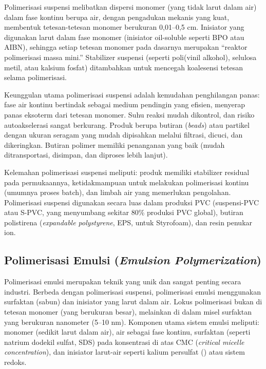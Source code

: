 \documentclass[12pt,a4paper,openany]{book}
\begin{document}
Polimerisasi suspensi melibatkan dispersi monomer (yang tidak larut dalam air) dalam fase kontinu berupa air, dengan pengadukan mekanis yang kuat, membentuk tetesan-tetesan monomer berukuran 0,01--0,5 cm. Inisiator yang digunakan larut dalam fase monomer (inisiator oil-soluble seperti BPO atau AIBN), sehingga setiap tetesan monomer pada dasarnya merupakan ``reaktor polimerisasi massa mini.'' Stabilizer suspensi (seperti poli(vinil alkohol), selulosa metil, atau kalsium fosfat) ditambahkan untuk mencegah koalesensi tetesan selama polimerisasi.

Keunggulan utama polimerisasi suspensi adalah kemudahan penghilangan panas: fase air kontinu bertindak sebagai medium pendingin yang efisien, menyerap panas eksoterm dari tetesan monomer. Suhu reaksi mudah dikontrol, dan risiko autoakselerasi sangat berkurang. Produk berupa butiran (\textit{beads}) atau partikel dengan ukuran seragam yang mudah dipisahkan melalui filtrasi, dicuci, dan dikeringkan. Butiran polimer memiliki penanganan yang baik (mudah ditransportasi, disimpan, dan diproses lebih lanjut).

Kelemahan polimerisasi suspensi meliputi: produk memiliki stabilizer residual pada permukaannya, ketidakmampuan untuk melakukan polimerisasi kontinu (umumnya proses batch), dan limbah air yang memerlukan pengolahan. Polimerisasi suspensi digunakan secara luas dalam produksi PVC (suspensi-PVC atau S-PVC, yang menyumbang sekitar 80\% produksi PVC global), butiran polistirena (\textit{expandable polystyrene}, EPS, untuk Styrofoam), dan resin penukar ion.

\subsection{Polimerisasi Emulsi (\textit{Emulsion Polymerization})}

Polimerisasi emulsi merupakan teknik yang unik dan sangat penting secara industri. Berbeda dengan polimerisasi suspensi, polimerisasi emulsi menggunakan surfaktan (sabun) dan inisiator yang larut dalam air. Lokus polimerisasi bukan di tetesan monomer (yang berukuran besar), melainkan di dalam misel surfaktan yang berukuran nanometer (5--10 nm). Komponen utama sistem emulsi meliputi: monomer (sedikit larut dalam air), air sebagai fase kontinu, surfaktan (seperti natrium dodekil sulfat, SDS) pada konsentrasi di atas CMC (\textit{critical micelle concentration}), dan inisiator larut-air seperti kalium persulfat () atau sistem redoks.
\end{document}
